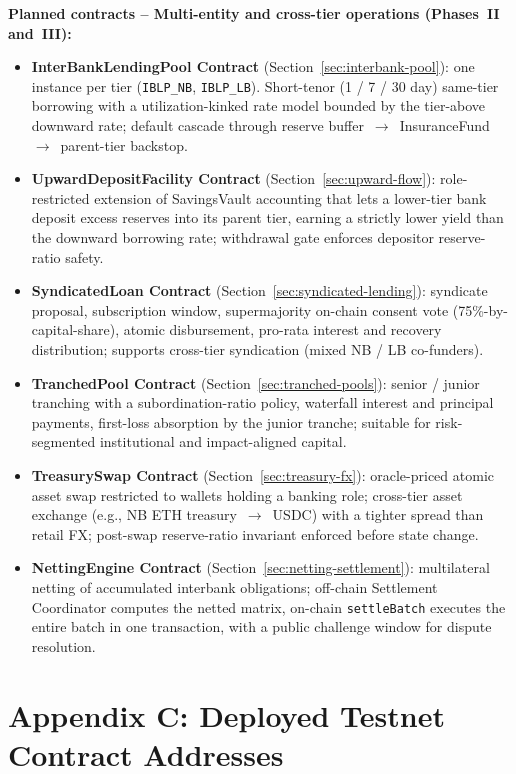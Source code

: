 \documentclass[12pt,a4paper]{report}
\begin{document}
\textbf{Planned contracts -- Multi-entity and cross-tier operations (Phases~II and~III):}
\begin{itemize}[noitemsep]
\item \textbf{InterBankLendingPool Contract} (Section~\ref{sec:interbank-pool}): one instance per tier (\texttt{IBLP\_NB}, \texttt{IBLP\_LB}). Short-tenor (1 / 7 / 30 day) same-tier borrowing with a utilization-kinked rate model bounded by the tier-above downward rate; default cascade through reserve buffer~$\to$~InsuranceFund~$\to$~parent-tier backstop.
\item \textbf{UpwardDepositFacility Contract} (Section~\ref{sec:upward-flow}): role-restricted extension of SavingsVault accounting that lets a lower-tier bank deposit excess reserves into its parent tier, earning a strictly lower yield than the downward borrowing rate; withdrawal gate enforces depositor reserve-ratio safety.
\item \textbf{SyndicatedLoan Contract} (Section~\ref{sec:syndicated-lending}): syndicate proposal, subscription window, supermajority on-chain consent vote (75\%-by-capital-share), atomic disbursement, pro-rata interest and recovery distribution; supports cross-tier syndication (mixed NB / LB co-funders).
\item \textbf{TranchedPool Contract} (Section~\ref{sec:tranched-pools}): senior / junior tranching with a subordination-ratio policy, waterfall interest and principal payments, first-loss absorption by the junior tranche; suitable for risk-segmented institutional and impact-aligned capital.
\item \textbf{TreasurySwap Contract} (Section~\ref{sec:treasury-fx}): oracle-priced atomic asset swap restricted to wallets holding a banking role; cross-tier asset exchange (e.g., NB ETH treasury~$\to$~USDC) with a tighter spread than retail FX; post-swap reserve-ratio invariant enforced before state change.
\item \textbf{NettingEngine Contract} (Section~\ref{sec:netting-settlement}): multilateral netting of accumulated interbank obligations; off-chain Settlement Coordinator computes the netted matrix, on-chain \texttt{settleBatch} executes the entire batch in one transaction, with a public challenge window for dispute resolution.
\end{itemize}


\chapter*{Appendix C: Deployed Testnet Contract Addresses}
{}
\end{document}
